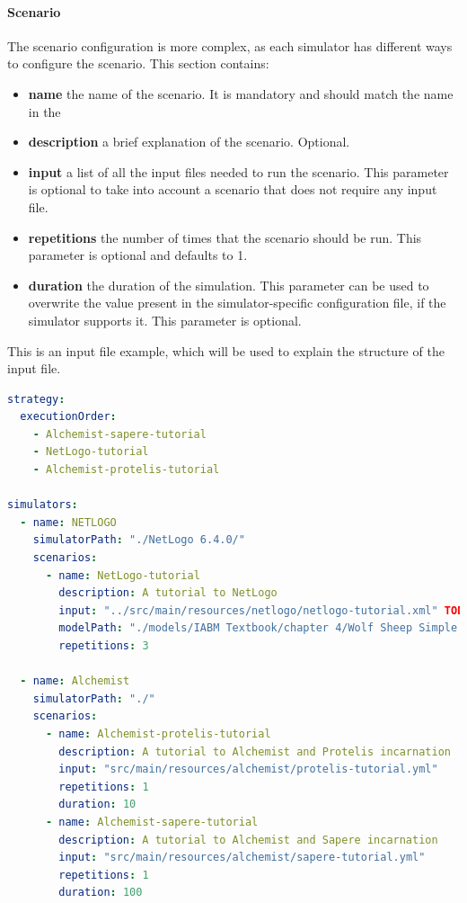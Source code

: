 \documentclass[12pt,a4paper,openright,twoside]{book}
\begin{document}
\paragraph*{Scenario}
The scenario configuration is more complex, as each simulator has different ways to configure the scenario.
This section contains:
\begin{itemize}
  \item \textbf{name} the name of the scenario. It is mandatory and should match the name in the
  \item \textbf{description} a brief explanation of the scenario. Optional.
  \item \textbf{input} a list of all the input files needed to run the scenario. This parameter is optional to take into account a scenario that does not require any input file.
  \item \textbf{repetitions} the number of times that the scenario should be run. This parameter is optional and defaults to 1.
  \item \textbf{duration} the duration of the simulation. This parameter can be used to overwrite the value present in the simulator-specific configuration file, if the simulator supports it. This parameter is optional.
\end{itemize}

This is an input file example, which will be used to explain the structure of the input file.

\begin{lstlisting}[language=yaml, caption={Benchmark configuration file structure}]
strategy:
  executionOrder:
    - Alchemist-sapere-tutorial
    - NetLogo-tutorial
    - Alchemist-protelis-tutorial

simulators:
  - name: NETLOGO
    simulatorPath: "./NetLogo 6.4.0/"
    scenarios:
      - name: NetLogo-tutorial
        description: A tutorial to NetLogo
        input: "../src/main/resources/netlogo/netlogo-tutorial.xml" TODO change to list
        modelPath: "./models/IABM Textbook/chapter 4/Wolf Sheep Simple 5.nlogo"
        repetitions: 3

  - name: Alchemist
    simulatorPath: "./"
    scenarios:
      - name: Alchemist-protelis-tutorial
        description: A tutorial to Alchemist and Protelis incarnation
        input: "src/main/resources/alchemist/protelis-tutorial.yml"
        repetitions: 1
        duration: 10
      - name: Alchemist-sapere-tutorial
        description: A tutorial to Alchemist and Sapere incarnation
        input: "src/main/resources/alchemist/sapere-tutorial.yml"
        repetitions: 1
        duration: 100
\end{lstlisting}
\end{document}
